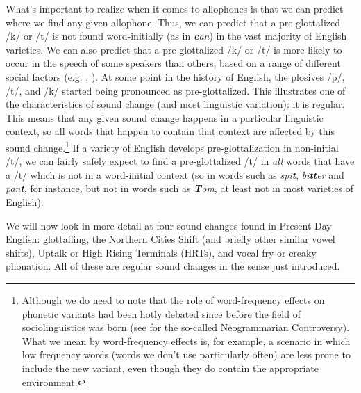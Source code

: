 What's important to realize when it comes to allophones is that we can predict where we find any given allophone. Thus, we can predict that a pre-glottalized /k/ or /t/ is not found word-initially (as in \emph{\textbf{c}an}) in the vast majority of English varieties. We can also predict that a pre-glottalized /k/ or /t/ is more likely to occur in the speech of some speakers than others, based on a range of different social factors (e.g. \citealp{Schleef2013}, \citealp{SmithHolmes-Elliott2017}). At some point in the history of English, the plosives /p/, /t/, and /k/ started being pronounced as pre-glottalized. This illustrates one of the characteristics of sound change (and most linguistic variation): it is regular. This means that any given sound change happens in a particular linguistic context, so all words that happen to contain that context are affected by this sound change.\footnote{Although we do need to note that the role of word-frequency effects on phonetic variants had been hotly debated since before the field of sociolinguistics was born (see \citealp{Labov1981} for the so-called Neogrammarian Controversy). What we mean by word-frequency effects is, for example, a scenario in which low frequency words (words we don't use particularly often) are less prone to include the new variant, even though they do contain the appropriate environment.} If a variety of English develops pre-glottalization in non-initial /t/, we can fairly safely expect to find a pre-glottalized /t/ in \emph{all} words that have a /t/ which is not in a word-initial context (so in words such as \emph{spi\textbf{t}}, \emph{bi\textbf{tt}er} and \emph{pan\textbf{t}}, for instance, but not in words such as \emph{\textbf{T}om}, at least not in most varieties of English).

We will now look in more detail at four sound changes found in Present Day English: glottalling, the Northern Cities Shift (and briefly other similar vowel shifts), Uptalk or High Rising Terminals (HRTs), and vocal fry or creaky phonation. All of these are regular sound changes in the sense just introduced.


